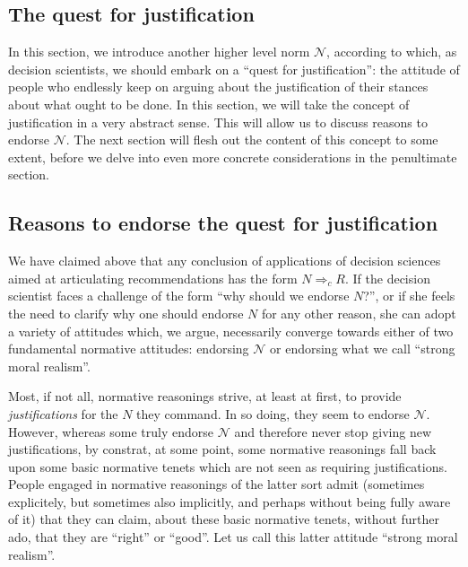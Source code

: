\documentclass[preprint, french, english, 11pt, authoryear]{elsarticle}%
\newcommand{\adv}{\mathscr{N}}
\begin{document}
\subsection{The quest for justification}
\label{sec-quest}
In this section, we introduce another higher level norm $\adv$, according to which, as decision scientists, we should embark on a ``quest for justification'': the attitude of people who endlessly keep on arguing about the justification of their stances about what ought to be done. In this section, we will take the concept of justification in a very abstract sense. This will allow us to discuss reasons to endorse $\adv$. The next section will flesh out the content of this concept to some extent, before we delve into even more concrete considerations in the penultimate section.

\subsection{Reasons to endorse the quest for justification}
We have claimed above that any conclusion of applications of decision sciences aimed at articulating recommendations has the form $N ⇒_c R$. If the decision scientist faces a challenge of the form ``why should we endorse $N$?'', or if she feels the need to clarify why one should endorse $N$ for any other reason, she can adopt a variety of attitudes which, we argue, necessarily converge towards either of two fundamental normative attitudes: endorsing $\adv$ or endorsing what we call ``strong moral realism''.

Most, if not all, normative reasonings strive, at least at first, to provide \emph{justifications} for the $N$ they command. In so doing, they seem to endorse $\adv$. However, whereas some truly endorse $\adv$ and therefore never stop giving new justifications, by constrat, at some point, some normative reasonings fall back upon some basic normative tenets which are not seen as requiring justifications. People engaged in normative reasonings of the latter sort admit (sometimes explicitely, but sometimes also implicitly, and perhaps without being fully aware of it) that they can claim, about these basic normative tenets, without further ado, that they are ``right'' or ``good''. Let us call this latter attitude ``strong moral realism''.
\end{document}
